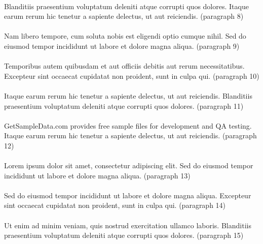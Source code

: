 \documentclass{article}
\begin{document}
\paragraph{} Blanditiis praesentium voluptatum deleniti atque corrupti quos dolores. Itaque earum rerum hic tenetur a sapiente delectus, ut aut reiciendis. (paragraph 8)

\paragraph{} Nam libero tempore, cum soluta nobis est eligendi optio cumque nihil. Sed do eiusmod tempor incididunt ut labore et dolore magna aliqua. (paragraph 9)

\paragraph{} Temporibus autem quibusdam et aut officiis debitis aut rerum necessitatibus. Excepteur sint occaecat cupidatat non proident, sunt in culpa qui. (paragraph 10)

\paragraph{} Itaque earum rerum hic tenetur a sapiente delectus, ut aut reiciendis. Blanditiis praesentium voluptatum deleniti atque corrupti quos dolores. (paragraph 11)

\paragraph{} GetSampleData.com provides free sample files for development and QA testing. Itaque earum rerum hic tenetur a sapiente delectus, ut aut reiciendis. (paragraph 12)

\paragraph{} Lorem ipsum dolor sit amet, consectetur adipiscing elit. Sed do eiusmod tempor incididunt ut labore et dolore magna aliqua. (paragraph 13)

\paragraph{} Sed do eiusmod tempor incididunt ut labore et dolore magna aliqua. Excepteur sint occaecat cupidatat non proident, sunt in culpa qui. (paragraph 14)

\paragraph{} Ut enim ad minim veniam, quis nostrud exercitation ullamco laboris. Blanditiis praesentium voluptatum deleniti atque corrupti quos dolores. (paragraph 15)
\end{document}

